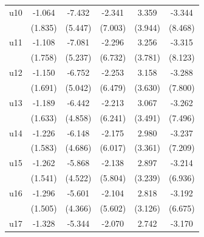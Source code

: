 \begin{table}[htbp]
\begin{tabular}{l*{5}{c}}
\addlinespace
u10                 &      -1.064         &      -7.432         &      -2.341         &       3.359         &      -3.344         \\
                    &     (1.835)         &     (5.447)         &     (7.003)         &     (3.944)         &     (8.468)         \\
\addlinespace
u11                 &      -1.108         &      -7.081         &      -2.296         &       3.256         &      -3.315         \\
                    &     (1.758)         &     (5.237)         &     (6.732)         &     (3.781)         &     (8.123)         \\
\addlinespace
u12                 &      -1.150         &      -6.752         &      -2.253         &       3.158         &      -3.288         \\
                    &     (1.691)         &     (5.042)         &     (6.479)         &     (3.630)         &     (7.800)         \\
\addlinespace
u13                 &      -1.189         &      -6.442         &      -2.213         &       3.067         &      -3.262         \\
                    &     (1.633)         &     (4.858)         &     (6.241)         &     (3.491)         &     (7.496)         \\
\addlinespace
u14                 &      -1.226         &      -6.148         &      -2.175         &       2.980         &      -3.237         \\
                    &     (1.583)         &     (4.686)         &     (6.017)         &     (3.361)         &     (7.209)         \\
\addlinespace
u15                 &      -1.262         &      -5.868         &      -2.138         &       2.897         &      -3.214         \\
                    &     (1.541)         &     (4.522)         &     (5.804)         &     (3.239)         &     (6.936)         \\
\addlinespace
u16                 &      -1.296         &      -5.601         &      -2.104         &       2.818         &      -3.192         \\
                    &     (1.505)         &     (4.366)         &     (5.602)         &     (3.126)         &     (6.675)         \\
\addlinespace
u17                 &      -1.328         &      -5.344         &      -2.070         &       2.742         &      -3.170         \\

\end{tabular}
\end{table}
